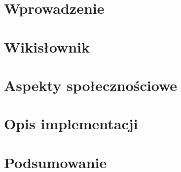 

\chapter{Wprowadzenie}


\chapter{Wikisłownik}


\chapter{Aspekty społecznościowe}


\chapter{Opis implementacji}


\chapter{Podsumowanie}



